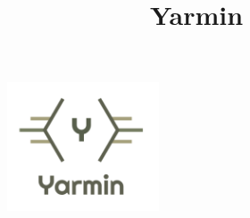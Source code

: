 \documentclass[a4paper, titlepage]{book}
\begin{document}
\title{ Yarmin  }

\begin{figure}[H]
	\maketitle
	\centering
	\includegraphics[width=0.4\textwidth,center]{Immagini/YarminLogo.png}

\end{figure}

\tableofcontents




\end{document}

